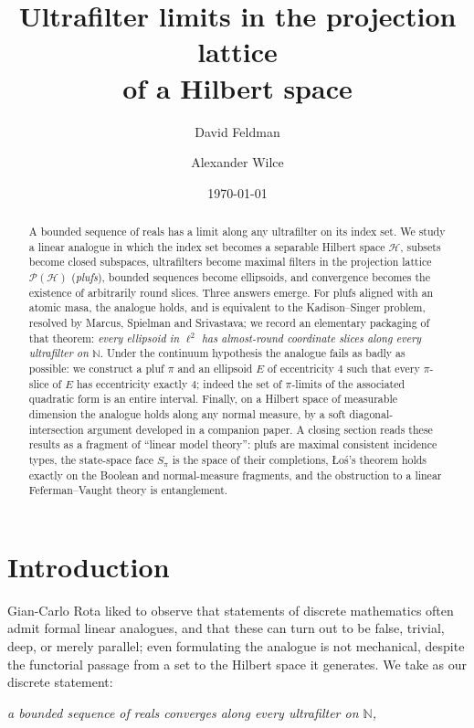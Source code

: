\documentclass[11pt,reqno]{amsart}
\title[Ultrafilter limits in the projection lattice]
{Ultrafilter limits in the projection lattice\\ of a Hilbert space}
\author{David Feldman}
\author{Alexander Wilce}
\date{\today}
\theoremstyle{definition}
\newcommand{\HH}{\mathcal{H}}
\newcommand{\PP}{\mathcal{P}}
\newcommand{\N}{\mathbb{N}}
\newcommand{\pluf}{\pi}
\begin{document}
\begin{abstract}
A bounded sequence of reals has a limit along any ultrafilter on its index set. We study
a linear analogue in which the index set becomes a separable Hilbert space $\HH$, subsets
become closed subspaces, ultrafilters become maximal filters in the projection lattice
$\PP(\HH)$ (\emph{plufs}), bounded sequences become ellipsoids, and convergence becomes
the existence of arbitrarily round slices. Three answers emerge. For plufs aligned with an
atomic masa, the analogue holds, and is equivalent to the Kadison--Singer problem, resolved
by Marcus, Spielman and Srivastava; we record an elementary packaging of that theorem:
\emph{every ellipsoid in $\ell^2$ has almost-round coordinate slices along every
ultrafilter on $\N$}. Under the continuum hypothesis the analogue fails as badly as
possible: we construct a pluf $\pluf$ and an ellipsoid $E$ of eccentricity $4$ such that
every $\pluf$-slice of $E$ has eccentricity exactly $4$; indeed the set of $\pluf$-limits
of the associated quadratic form is an entire interval. Finally, on a Hilbert space of
measurable dimension the analogue holds along any normal measure, by a soft diagonal-intersection
argument developed in a companion paper. A closing section reads these results as a
fragment of ``linear model theory'': plufs are maximal consistent incidence types, the
state-space face $S_\pluf$ is the space of their completions, \L o\'s's theorem holds
exactly on the Boolean and normal-measure fragments, and the obstruction to a linear
Feferman--Vaught theory is entanglement.
\end{abstract}

\maketitle

\section{Introduction}\label{sec:intro}

Gian-Carlo Rota liked to observe that statements of discrete mathematics often admit formal
linear analogues, and that these can turn out to be false, trivial, deep, or merely
parallel; even formulating the analogue is not mechanical, despite the functorial passage
from a set to the Hilbert space it generates. We take as our discrete statement:

\begin{center}
\emph{a bounded sequence of reals converges along every ultrafilter on $\N$,}
\end{center}
\end{document}
